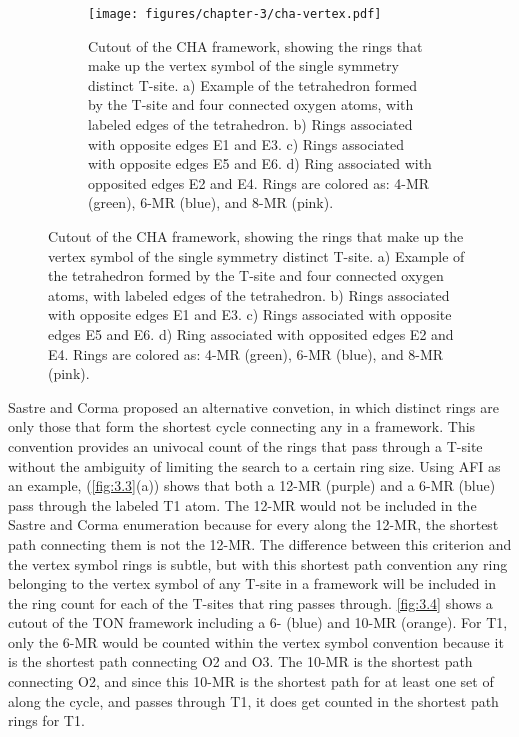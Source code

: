 \documentclass[preprint,numrefs,noinfo,sort&compress]{elsarticle}
\begin{document}
\begin{figure}
\begin{figure}[H]
\centering
\texttt{[image: figures/chapter-3/cha-vertex.pdf]}
\caption{Cutout of the CHA framework, showing the rings that make up the vertex symbol of the single symmetry distinct T-site. a) Example of the tetrahedron formed by the T-site and four connected oxygen atoms, with labeled edges of the tetrahedron. b) Rings associated with opposite edges E1 and E3. c) Rings associated with opposite edges E5 and E6. d) Ring associated with opposited edges E2 and E4. Rings are colored as: 4-MR (green), 6-MR (blue), and 8-MR (pink). \label{fig:cha-vertex}}
\end{figure}
\end{figure}

Sastre and Corma \cite{sastre-topological-2009} proposed an alternative convetion, in which distinct rings are only those that form the shortest cycle connecting any  in a framework. This convention provides an univocal count of the rings that pass through a T-site without the ambiguity of limiting the search to a certain ring size. Using AFI as an example,  (\cref{fig:3.3}(a)) shows that both a 12-MR (purple) and a 6-MR (blue) pass through the labeled T1 atom. The 12-MR would not be included in the Sastre and Corma enumeration because for every  along the 12-MR, the shortest path connecting them is not the 12-MR. The difference between this criterion and the vertex symbol rings is subtle, but with this shortest path convention any ring belonging to the vertex symbol of any T-site in a framework will be included in the ring count for each of the T-sites that ring passes through. \cref{fig:3.4} shows a cutout of the TON framework including a 6- (blue) and 10-MR (orange). For T1, only the 6-MR would be counted within the vertex symbol convention because it is the shortest path connecting O2 and O3. The 10-MR is the shortest path connecting O2, and since this 10-MR is the shortest path for at least one set of  along the cycle, and passes through T1, it does get counted in the shortest path rings for T1.
\end{document}
